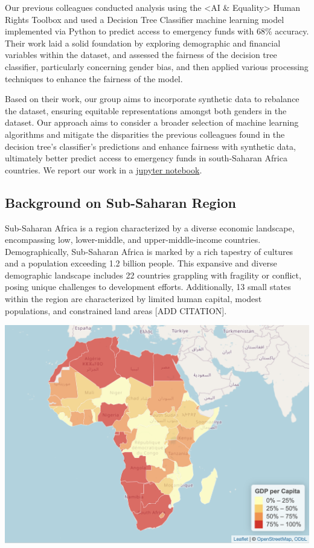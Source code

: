 \documentclass[12pt]{article}
\begin{document}
Our previous colleagues conducted analysis using the \textless AI \&
Equality\textgreater{} Human Rights Toolbox and used a Decision Tree
Classifier machine learning model implemented via Python to predict
access to emergency funds with 68\% accuracy. Their work laid a solid
foundation by exploring demographic and financial variables within the
dataset, and assessed the fairness of the decision tree classifier,
particularly concerning gender bias, and then applied various processing
techniques to enhance the fairness of the model\citep{Porta2022}.

Based on their work, our group aims to incorporate synthetic data to
rebalance the dataset, ensuring equitable representations amongst both
genders in the dataset. Our approach aims to consider a broader
selection of machine learning algorithms and mitigate the disparities
the previous colleagues found in the decision tree's classifier's
predictions and enhance fairness with synthetic data, ultimately better
predict access to emergency funds in south-Saharan Africa
countries\citep{SyntheticDataAIEquality}. We report our work in a
\href{https://colab.research.google.com/drive/10Fwjp8X8FvKoSy_AWASBTrHFwgOQOOWn}{jupyter
notebook}.

\hypertarget{background-on-sub-saharan-region}{%
\subsection{Background on Sub-Saharan
Region}\label{background-on-sub-saharan-region}}

Sub-Saharan Africa is a region characterized by a diverse economic
landscape, encompassing low, lower-middle, and upper-middle-income
countries. Demographically, Sub-Saharan Africa is marked by a rich
tapestry of cultures and a population exceeding 1.2 billion people. This
expansive and diverse demographic landscape includes 22 countries
grappling with fragility or conflict, posing unique challenges to
development efforts. Additionally, 13 small states within the region are
characterized by limited human capital, modest populations, and
constrained land areas {[}ADD CITATION{]}.

\begin{center}\includegraphics[width=0.7\linewidth]{graphs/map} \end{center}
\end{document}
